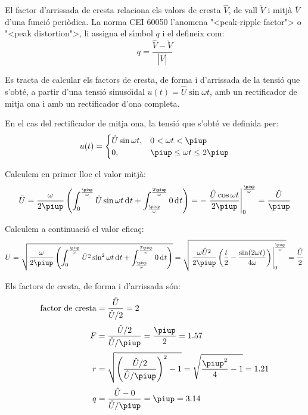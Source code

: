 El factor d'arrissada de cresta relaciona els valors de cresta $\hat{V}$, de vall $\check{V}$  i mitj\`{a} $\bar{V}$
 d'una funci\'{o} peri\`{o}dica. La norma \textsf{CEI 60050} l'anomena {"<}peak-ripple factor{">} o {"<}peak distortion{">}, li assigna el s\'{\i}mbol $q$ i el defineix com:
\begin{equation}
    q = \frac{\hat{V} - \check{V}}{|\bar{V}|}
\end{equation}

\begin{exemple}
    Es tracta de calcular els factors de cresta, de forma i d'arrissada
    de la tensi\'{o}  que s'obt\'{e}, a partir d'una tensi\'{o} sinuso\"{\i}dal
    $u(t) = \hat{U} \sin\omega t$, amb un rectificador de mitja ona i
    amb un rectificador d'ona completa.

    En el cas del rectificador de mitja ona, la tensi\'{o} que s'obt\'{e} ve
    definida per:
    \[
    u(t) = \begin{cases} \hat{U} \sin\omega t, & 0 < \omega t < \piup\\
           0, & \piup \leq \omega t \leq 2\piup \end{cases}
    \]

    Calculem en primer lloc el valor mitj\`{a}:
    \[
    \bar{U} = \frac{\omega}{2\piup} \left( \int_0^\frac{\piup}{\omega}
    \hat{U} \sin\omega t \diff t +
    \int_\frac{\piup}{\omega}^\frac{2\piup}{\omega} 0 \diff t \right) = -
    \left. \frac{\hat{U} \cos\omega t}{2\piup}
    \right|_0^\frac{\piup}{\omega} = \frac{\hat{U}}{\piup}
    \]

    Calculem a continuaci\'{o} el valor efica\c{c}:
    \[
    U = \sqrt{\frac{\omega}{2\piup} \left( \int_0^\frac{\piup}{\omega}
    \hat{U}^2 \sin^2\omega t \diff t +
    \int_\frac{\piup}{\omega}^\frac{2\piup}{\omega} 0 \diff t \right)} =
      \sqrt{\left.\frac{\omega \hat{U}^2}{2\piup}\left( \frac{t}{2} -
    \frac{\sin (2\omega t)}{4\omega}
    \right)\right|_0^\frac{\piup}{\omega}} = \frac{\hat{U}}{2}
    \]

    Els factors de cresta, de forma i d'arrissada s\'{o}n:
    \begin{align*}
        \text{factor de cresta} &= \frac{\hat{U}}{\hat{U}/2} = 2 \\[0.5ex]
        F &= \frac{\hat{U}/2}{\hat{U}/\piup} =\frac{\piup}{2} =
        \num{1,57} \\[0.5ex]
        r &= \sqrt{\left(\frac{\hat{U}/2}{\hat{U}/\piup}\right)^2-1} =
    \sqrt{\frac{\piup^2}{4}-1} = \num{1,21} \\[0.5ex]
        q &= \frac{\hat{U} - 0}{\hat{U}/\piup} = \piup = \num{3,14}
    \end{align*}



\end{exemple}
